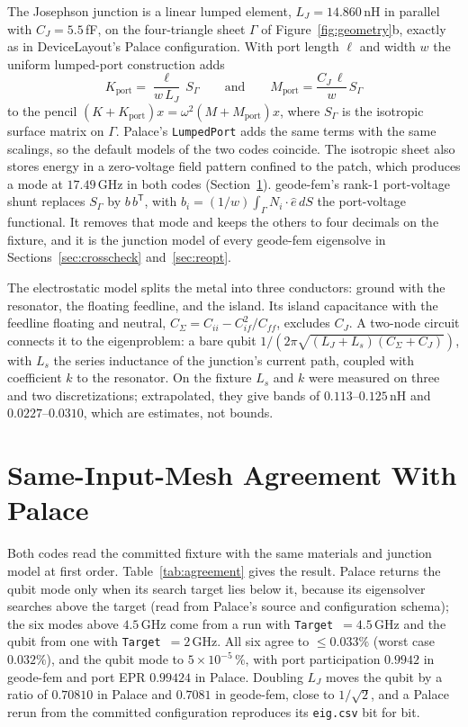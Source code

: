 \documentclass{anvil-paper}
\begin{document}
The Josephson junction is a linear lumped element, $L_J = 14.860$\,nH in
parallel with $C_J = 5.5$\,fF, on the four-triangle sheet $\Gamma$ of
Figure~\ref{fig:geometry}b, exactly as in DeviceLayout's Palace
configuration. With port length $\ell$ and width $w$ the uniform
lumped-port construction adds
\begin{equation}
  K_{\mathrm{port}} = \frac{\ell}{w\,L_J}\, S_\Gamma
  \qquad\text{and}\qquad
  M_{\mathrm{port}} = \frac{C_J\,\ell}{w}\, S_\Gamma
  \label{eq:port}
\end{equation}
to the pencil $(K + K_{\mathrm{port}})x = \omega^2(M + M_{\mathrm{port}})x$,
where $S_\Gamma$ is the isotropic surface matrix on $\Gamma$. Palace's
\texttt{LumpedPort} adds the same terms with the same scalings, so the
default models of the two codes coincide. The isotropic sheet also stores
energy in a zero-voltage field pattern confined to the patch, which
produces a mode at $17.49$\,GHz in both codes
(Section~\ref{sec:agreement}). geode-fem's rank-1 port-voltage shunt
replaces $S_\Gamma$ by $b\,b^{\mathsf T}$, with $b_i = (1/w)\int_\Gamma
N_i\cdot\hat e\,dS$ the port-voltage functional. It removes that mode and
keeps the others to four decimals on the fixture, and it is the junction
model of every geode-fem eigensolve in Sections~\ref{sec:crosscheck}
and~\ref{sec:reopt}.

The electrostatic model splits the metal into three conductors: ground
with the resonator, the floating feedline, and the island. Its island
capacitance with the feedline floating and neutral,
$C_\Sigma = C_{ii} - C_{if}^2/C_{ff}$, excludes $C_J$. A two-node circuit
connects it to the eigenproblem: a bare qubit
$1/(2\pi\sqrt{(L_J + L_s)(C_\Sigma + C_J)})$, with $L_s$ the series
inductance of the junction's current path, coupled with coefficient $k$
to the resonator. On the fixture $L_s$ and $k$ were measured on three and
two discretizations; extrapolated, they give bands of
$0.113$--$0.125$\,nH and $0.0227$--$0.0310$, which are estimates, not
bounds.

\section{Same-Input-Mesh Agreement With Palace}
\label{sec:agreement}

Both codes read the committed fixture with the same materials and
junction model at first order. Table~\ref{tab:agreement} gives the
result. Palace returns the qubit mode only when its search target lies
below it, because its eigensolver searches above the target (read from
Palace's source and configuration schema); the six
modes above $4.5$\,GHz come from a run with \texttt{Target}~$=4.5$\,GHz
and the qubit from one with \texttt{Target}~$=2$\,GHz. All six agree to
$\leq 0.033\%$ (worst case $0.032\%$), and the qubit mode to
$5\times10^{-5}\,\%$, with port participation $0.9942$ in geode-fem and
port EPR $0.99424$ in Palace. Doubling $L_J$ moves the qubit by a ratio of
$0.70810$ in Palace and $0.7081$ in geode-fem, close to $1/\sqrt2$, and a
Palace rerun from the committed configuration reproduces its
\texttt{eig.csv} bit for bit.
\end{document}

